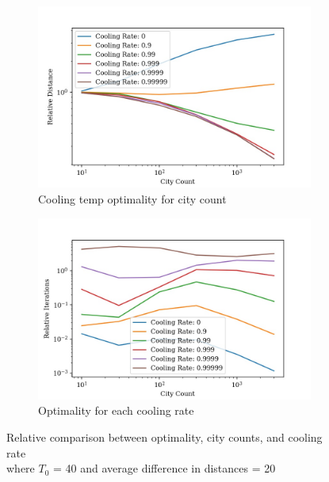 \documentclass{article}
\begin{document}
\begin{figure}[H]
    \centering
    \begin{subfigure}{0.5\textwidth}
        \centering
        \includegraphics[width=1\linewidth]{images/rand_cooling_rate_city_count_distance_relative.jpg}
        \caption{Cooling temp optimality for city count}
        \label{fig:sub1}
    \end{subfigure}%
    \begin{subfigure}{0.5\textwidth}
        \centering
        \includegraphics[width=1\linewidth]{images/rand_cooling_rate_city_count_iterations_relative.jpg}
        \caption{Optimality for each cooling rate}
        \label{fig:sub2}
    \end{subfigure}
    \captionsetup{justification=centering}
    \label{rand-cooling-rate}
    \caption{Relative comparison between optimality, city counts, and cooling rate \\ where $T_0$ = 40 and average difference in distances = 20}
\end{figure}
\end{document}
